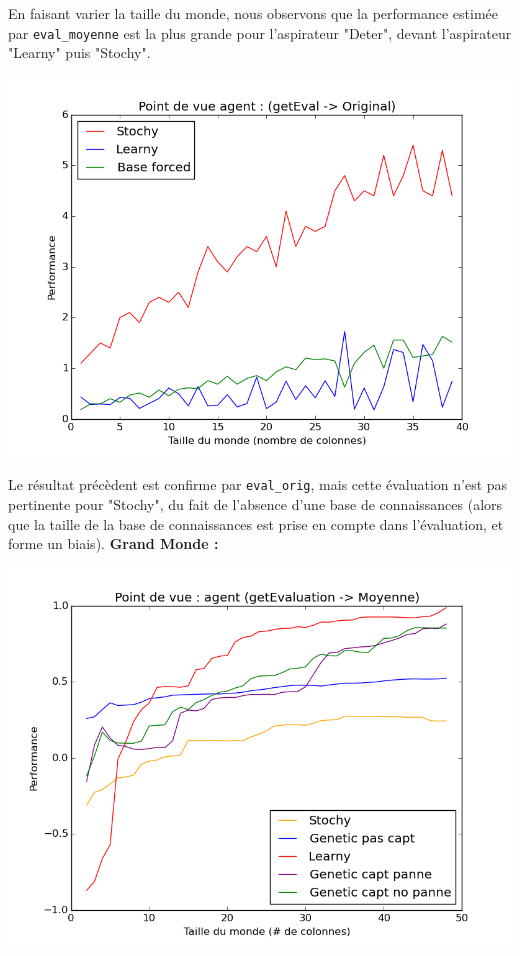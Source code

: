 \documentclass[12pt]{article}
\begin{document}
\justify
En faisant varier la taille du monde, nous observons que la performance estimée par \texttt{eval\_moyenne} est la plus grande pour l'aspirateur "Deter", devant l'aspirateur "Learny" puis "Stochy". 
\begin{center}
\includegraphics[scale=0.5]{geteval_orig_01}
\end{center} 
Le résultat précèdent est confirme par \texttt{eval\_orig}, mais cette évaluation n'est pas pertinente pour "Stochy", du fait de l'absence d'une base de connaissances (alors que la taille de la base de connaissances est prise en compte dans l'évaluation, et forme un biais). 
\justify
\textbf{Grand Monde :}
\begin{center}
\includegraphics[scale=0.5]{geteval_moy_tout}
\end{center}
\end{document}
